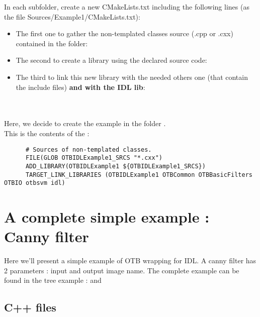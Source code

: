 In each subfolder, create a new CMakeLists.txt including the following lines (as the file Sources/Example1/CMakeLists.txt):
\begin{itemize}
\item The first one to gather the non-templated classes source (.cpp or .cxx) contained in the folder:\\ 
\item The second to create a library using the declared source code:\\
\item The third to link this new library with the needed others one (that contain the include files) \textbf{and with the IDL lib}:\\
\\ 
\end{itemize}

\\
      Here, we decide to create the example  in the folder .\\
      This is the contents of the :\\
\begin{verbatim}
      # Sources of non-templated classes.
      FILE(GLOB OTBIDLExample1_SRCS "*.cxx")
      ADD_LIBRARY(OTBIDLExample1 ${OTBIDLExample1_SRCS})
      TARGET_LINK_LIBRARIES (OTBIDLExample1 OTBCommon OTBBasicFilters OTBIO otbsvm idl)
\end{verbatim}


\section{A complete simple example : Canny filter}
\label{canny}
Here we'll present a simple example of OTB wrapping for IDL.
A canny filter has 2 parameters : input and output image name.
The complete example can be found in the tree example :  and 
\subsection{C++ files}
